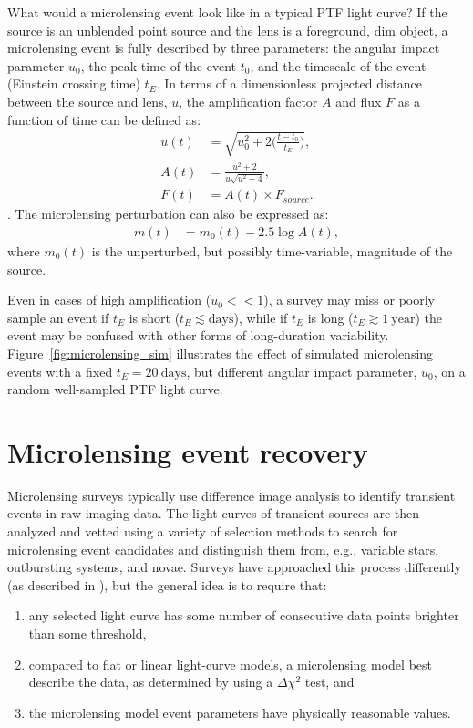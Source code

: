\documentclass{emulateapj}
\begin{document}
What would a microlensing event look like in a typical PTF light curve? If the source is an unblended point source and the lens is a foreground, dim object, a microlensing event is fully described by three parameters: the angular impact parameter $u_0$, the peak time of the event $t_0$, and the timescale of the event (Einstein crossing time) $t_E$. In terms of a dimensionless projected distance between the source and lens, $u$, the amplification factor $A$ and flux $F$ as a function of time can be defined as: 
\begin{align}
	u(t) &= \sqrt{u_0^2 + 2\Big(\frac{t-t_0}{t_E}\Big)},\\
	A(t) &= \frac{u^2 + 2}{u\sqrt{u^2 + 4}},\\
	F(t) &= A(t)\times F_{source}.
\end{align}
\citep{paczynski1986}. The microlensing perturbation can also be expressed as:
\begin{align}\label{eq:ml_model}
	m(t) &= m_0(t) - 2.5\log A(t),
\end{align}
where $m_0(t)$ is the unperturbed, but possibly time-variable, magnitude of the source.


Even in cases of high amplification ($u_0<<1$), a survey may miss or poorly sample an event if $t_E$ is short ($t_E \lesssim\mathrm{days}$), while if $t_E$ is long ($t_E \gtrsim 1~\mathrm{year}$) the event may be confused with other forms of long-duration variability. Figure~\ref{fig:microlensing_sim} illustrates the effect of simulated microlensing events with a fixed $t_E=20~\mathrm{days}$, but different angular impact parameter, $u_0$, on a random well-sampled PTF light curve. 

\section{Microlensing event recovery} \label{sec:event_recovery}
Microlensing surveys typically use difference image analysis \citep{alard1998} to identify transient events in raw imaging data. The light curves of transient sources are then analyzed and vetted using a variety of selection methods to search for microlensing event candidates and distinguish them from, e.g., variable stars, outbursting systems, and novae. Surveys have approached this process differently (as described in \citealt{ogle_optical_depth, con_idx, alcock2000, macho_detection_efficiency, udalski03,  hamadache2009, wyrzykowski2009, sumi2011}), but the general idea is to require that: 
\begin{enumerate}
	\item any selected light curve has some number of consecutive data points brighter than some threshold,
	\item compared to flat or linear light-curve models, a microlensing model best describe the data, as determined by using a $\Delta\chi^2$ test, and
	\item the microlensing model event parameters have physically reasonable values.
\end{enumerate}
\end{document}
